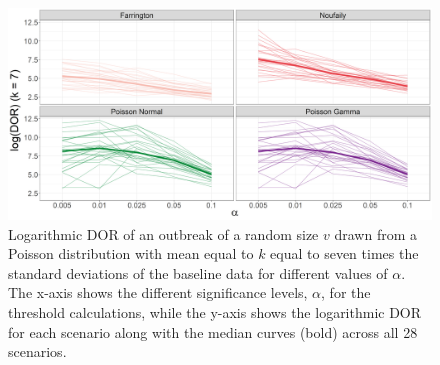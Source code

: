 \documentclass[preprint, 3p, authoryear]{elsarticle} %
\begin{document}
\begin{figure}[H]
\includegraphics[width=1\linewidth]{../../figures/logDORk7} \caption{Logarithmic DOR of an outbreak of a random size \(v\) drawn from a Poisson distribution with mean equal to \(k\) equal to seven times the standard deviations of the baseline data for different values of \(\alpha\). The x-axis shows the different significance levels, \(\alpha\), for the threshold calculations, while the y-axis shows the logarithmic DOR for each scenario along with the median curves (bold) across all 28 scenarios.}\label{fig:logDORk7}
\end{figure}

\newpage

\renewcommand\refname{References}

\end{document}
